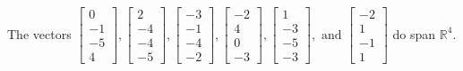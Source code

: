 \begin{exercise}
\begin{exerciseStatement}
  \end{exerciseStatement}
  \begin{exerciseAnswer}
   The vectors \(\left[\begin{array}{r}
0 \\
-1 \\
-5 \\
4
\end{array}\right] , \left[\begin{array}{r}
2 \\
-4 \\
-4 \\
-5
\end{array}\right] , \left[\begin{array}{r}
-3 \\
-1 \\
-4 \\
-2
\end{array}\right] , \left[\begin{array}{r}
-2 \\
4 \\
0 \\
-3
\end{array}\right] , \left[\begin{array}{r}
1 \\
-3 \\
-5 \\
-3
\end{array}\right] , \text{ and } \left[\begin{array}{r}
-2 \\
1 \\
-1 \\
1
\end{array}\right]\) 
  	 do  
	span \(\mathbb{R}^4\).
  


  \end{exerciseAnswer}
\end{exercise}